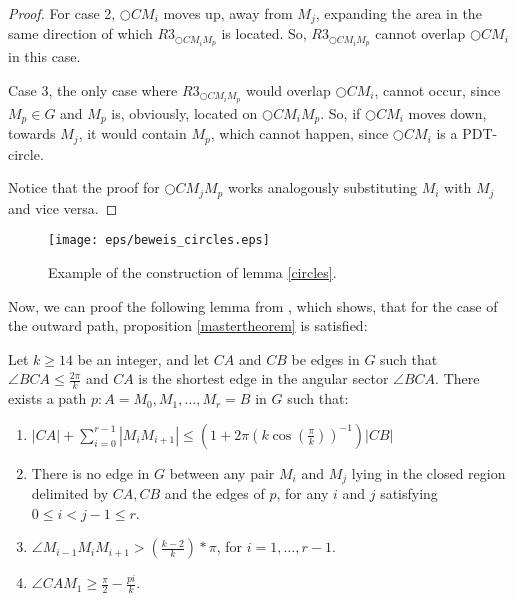 \begin{proof}
For case 2, $\bigcirc{CM_i} $ moves up, away from $M_j $, expanding the area in the same direction of which $R3_{\bigcirc{CM_iM_p}} $ is located.
So, $R3_{\bigcirc{CM_iM_p}} $ cannot overlap $\bigcirc{CM_i} $ in this case.

Case 3, the only case where $R3_{\bigcirc{CM_iM_p}} $ would overlap $\bigcirc{CM_i} $, cannot occur, since $M_p \in G $ and $M_p $ is, obviously, located on $\bigcirc{CM_iM_p} $.
So, if $\bigcirc{CM_i} $ moves down, towards $M_j $, it would contain $M_p $, which cannot happen, since $\bigcirc{CM_i} $ is a PDT-circle. 

Notice that the proof for $\bigcirc{CM_jM_p} $ works analogously substituting $M_i $ with $M_j $ and vice versa.
 
\end{proof}
\begin{figure}[h!]
\centering
\texttt{[image: eps/beweis\_circles.eps]}
\caption{Example of the construction of lemma \ref{circles}.}
\label{fig:beweis_circles}
\end{figure}

Now, we can proof the following lemma from \cite{kanj}, which shows, that for the case of the outward path, proposition \ref{mastertheorem} is satisfied:

\begin{lemma}
Let $k \geq 14$ be an integer, and let $CA $ and $CB $ be edges in $G $ such that $\angle{BCA} \leq \frac{2\pi}{k} $ and $CA $ is the shortest edge in the angular sector $\angle{BCA} $. There exists a path $p : A=M_0, M_1, \dotsc, M_r=B $ in $G $ such that:
\begin{enumerate}
\renewcommand{\labelenumi}{(\roman{enumi})}
\item $|CA| + \sum_{i=0}^{r-1}|M_iM_{i+1}| \leq (1+2\pi(k \cos(\frac{\pi}{k}))^{-1})|CB|$
\item There is no edge in $G $ between any pair $M_i $ and $M_j $ lying in the closed region delimited by $CA, CB $ and the edges of $p $, for any $i $ and $j $ satisfying $0 \leq i < j -1 \leq r $.
\item $\angle{M_{i-1}M_iM_{i+1}} > (\frac{k-2}{k})*\pi $, for $i=1,\dotsc,r-1 $.
\item $\angle{CAM_1} \geq \frac{\pi}{2} - \frac{pi}{k} $.
\end{enumerate}	 
\end{lemma}

